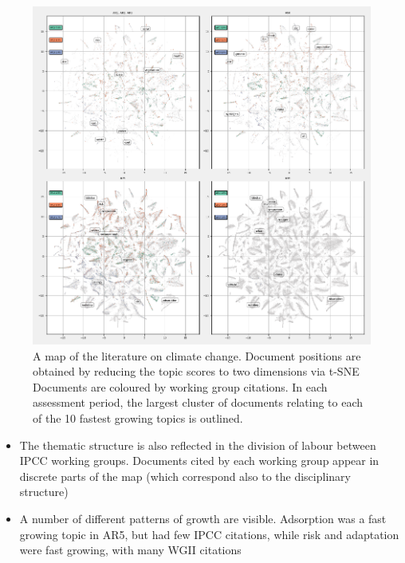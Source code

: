 \documentclass{article}
\begin{document}
\begin{figure}[h!]
	\begin{center}
		\includegraphics[width=1\linewidth]{tsne_results/plots/run_1771_s_0_p200_evolution_4.png}
		\caption{A map of the literature on climate change. Document positions are obtained by reducing the topic scores to two dimensions via t-SNE Documents are coloured by working group citations. In each assessment period, the largest cluster of documents relating to each of the 10 fastest growing topics is outlined.}
		\label{map-evolution}
		
	\end{center}
\end{figure}

\begin{itemize}
	\item The thematic structure is also reflected in the division of labour between IPCC working groups. Documents cited by each working group appear in discrete parts of the map (which correspond also to the disciplinary structure)
	\item A number of different patterns of growth are visible. Adsorption was a fast growing topic in AR5, but had few IPCC citations, while risk and adaptation were fast growing, with many WGII citations

	
\end{itemize}
\end{document}
